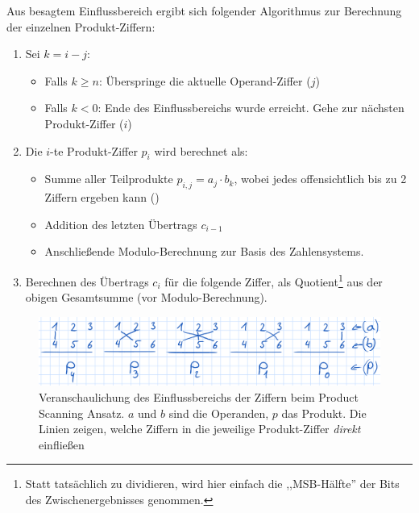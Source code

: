     Aus besagtem Einflussbereich ergibt sich folgender Algorithmus zur Berechnung der einzelnen Produkt-Ziffern:
    \begin{enumerate}
        \item Sei $k=i-j$:
            \begin{itemize} \tightlist
                \item Falls $k \ge n$: Überspringe die aktuelle Operand-Ziffer ($j$)
                \item Falls $k < 0$: Ende des Einflussbereichs wurde erreicht. Gehe zur nächsten Produkt-Ziffer ($i$)
            \end{itemize}

        \item Die $i$-te Produkt-Ziffer $p_i$ wird berechnet als:
            \begin{itemize} \tightlist
                \item Summe aller Teilprodukte $p_{i,j} = a_j \cdot b_k$, wobei jedes offensichtlich bis zu 2 Ziffern ergeben kann ()
                \item Addition des letzten Übertrags $c_{i-1}$
                \item Anschließende Modulo-Berechnung zur Basis des Zahlensystems.
            \end{itemize}
        \item Berechnen des Übertrags $c_{i}$ für die folgende Ziffer, als Quotient\footnote{Statt tatsächlich zu dividieren, wird hier einfach die ,,MSB-Hälfte'' der Bits des Zwischenergebnisses genommen.} aus  der obigen Gesamtsumme (vor Modulo-Berechnung).
    \end{enumerate}

    \begin{figure}[H]
        \centering
        \includegraphics[width=0.7\linewidth]{images/prodscanningeinfluss}
        \caption{Veranschaulichung des Einflussbereichs der Ziffern beim Product Scanning Ansatz. $a$ und $b$ sind die Operanden, $p$ das Produkt. Die Linien zeigen, welche Ziffern in die jeweilige Produkt-Ziffer \emph{direkt} einfließen}
        \label{fig:prodscanningeinfluss}
    \end{figure}

